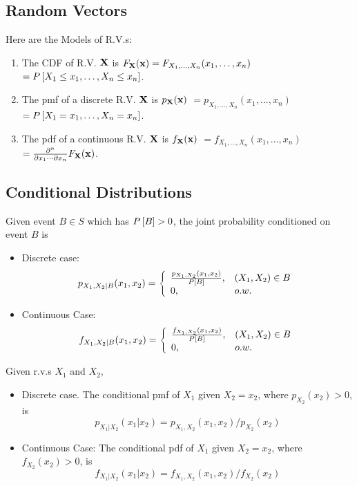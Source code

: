 \subsection{Random Vectors}


Here are the Models of R.V.s:
\begin{enumerate}
  \item The CDF of R.V. $\mathbf{X}$ is $F_{\mathbf{X}}(\mathbf{x}) = F_{X_1, \ldots,
    X_n}(x_1, \ldots, x_n)$ $= P\left[{X_1 \le x_1, \ldots, X_n \le x_n}\right]$.
  \item The pmf of a discrete R.V. $\mathbf{X}$ is $p_{\mathbf{X}}(\mathbf{x}) $ $= p_{X_1, \ldots,
    X_n}(x_1, \ldots, x_n) $  $= P\left[{X_1 = x_1, \ldots, X_n = x_n}\right]$.
  \item The pdf of a continuous R.V. $\mathbf{X}$ is $f_{\mathbf{X}}(\mathbf{x}) $ $= f_{X_1, \ldots,
    X_n}(x_1, \ldots, x_n) $ $= \tfrac{\partial^n}{\partial x_1 \cdots \partial x_n} F_{\mathbf{X}}(\mathbf{x})$.
\end{enumerate}

\subsection{Conditional Distributions}

\vspace{0.15in}\noindent Given event $B \in S$ which has $P\left[{B}\right]>0$,
the joint probability conditioned on event $B$ is
\begin{itemize}
  \item Discrete case:
    \[ p_{X_1, X_2 | B}(x_1, x_2) = { \left\{\begin{array}{ll} {\frac{p_{X_1, X_2}(x_1, x_2)}{ P\left[{B}\right]}}, & {(X_1, X_2) \in B} \\ 0, & o.w. \end{array}\right. }
    \]
  \item Continuous Case:
    \[ f_{X_1, X_2 | B}(x_1, x_2) = { \left\{\begin{array}{ll} {\frac{f_{X_1, X_2}(x_1, x_2)}{ P\left[{B}\right]}}, & {(X_1, X_2) \in B} \\ 0, & o.w. \end{array}\right. }
    \]
\end{itemize}

\vspace{0.15in}\noindent Given r.v.s $X_1$ and $X_2$,
\begin{itemize}
  \item Discrete case.  The conditional pmf of $X_1$ given $X_2=x_2$, where $p_{X_2}(x_2) > 0$, is
    \[ p_{X_1| X_2 }(x_1| x_2) = p_{X_1, X_2}(x_1 , x_2) / p_{X_2}(x_2)
    \]
  \item Continuous Case:  The conditional pdf of $X_1$ given
  $X_2=x_2$, where $f_{X_2}(x_2) > 0$, is
    \[ f_{X_1| X_2 }(x_1| x_2) = f_{X_1, X_2}(x_1, x_2) / f_{X_2}(x_2)
    \]
\end{itemize}

